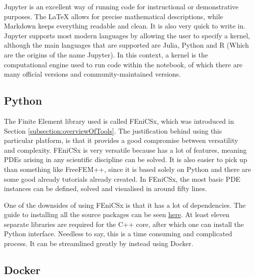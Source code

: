 Jupyter is an excellent way of running code for instructional or demonstrative purposes. The LaTeX allows for precise mathematical descriptions, while Markdown keeps everything readable and clean. It is also very quick to write in. Jupyter supports most modern languages by allowing the user to specify a kernel, although the main languages that are supported are Julia, Python and R (Which are the origins of the name Jupyter). In this context, a kernel is the computational engine used to run code within the notebook, of which there are many official versions and community-maintained versions.

\subsection{Python}

The Finite Element library used is called FEniCSx, which was introduced in Section \ref{subsection:overviewOfTools}. The justification behind using this particular platform, is that it provides a good compromise between versatility and complexity. FEniCSx is very versatile because has a lot of features, meaning PDEs arising in any scientific discipline can be solved. It is also easier to pick up than something like FreeFEM++, since it is based solely on Python and there are some good already tutorials already created. In FEniCSx, the most basic PDE instances can be defined, solved and visualised in around fifty lines.

One of the downsides of using FEniCSx is that it has a lot of dependencies. The guide to installing all the source packages can be seen \href{https://docs.fenicsproject.org/dolfinx/main/python/installation.html#source}{here}. At least eleven separate libraries are required for the C++ core, after which one can install the Python interface. Needless to say, this is a time consuming and complicated process. It can be streamlined greatly by instead using Docker.

\subsection{Docker}

